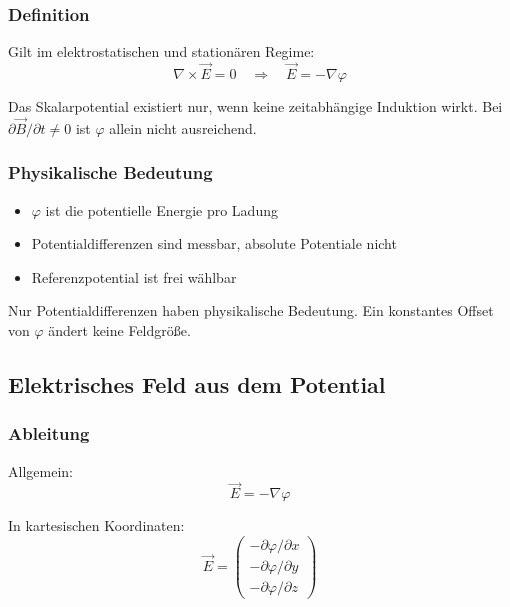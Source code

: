 \documentclass[a4paper]{article}
\newcommand{\E}{\vec E}
\newcommand{\B}{\vec B}
\begin{document}
\subsubsection{Definition}

Gilt im elektrostatischen und stationären Regime:
\[
\nabla \times \E = 0
\quad \Rightarrow \quad
\E = -\nabla \varphi
\]

\begin{merke}
Das Skalarpotential existiert nur, wenn keine zeitabhängige Induktion wirkt.
Bei $\partial \B/\partial t \neq 0$ ist $\varphi$ allein nicht ausreichend.
\end{merke}

\subsubsection{Physikalische Bedeutung}

\begin{itemize}
  \item $\varphi$ ist die potentielle Energie pro Ladung
  \item Potentialdifferenzen sind messbar, absolute Potentiale nicht
  \item Referenzpotential ist frei wählbar
\end{itemize}

\begin{schema}
Nur Potentialdifferenzen haben physikalische Bedeutung.
Ein konstantes Offset von $\varphi$ ändert keine Feldgröße.
\end{schema}

\subsection{Elektrisches Feld aus dem Potential}

\subsubsection{Ableitung}

Allgemein:
\[
\E = -\nabla \varphi
\]

In kartesischen Koordinaten:
\[
\E =
\begin{pmatrix}
-\partial \varphi/\partial x \\
-\partial \varphi/\partial y \\
-\partial \varphi/\partial z
\end{pmatrix}
\]
\end{document}
